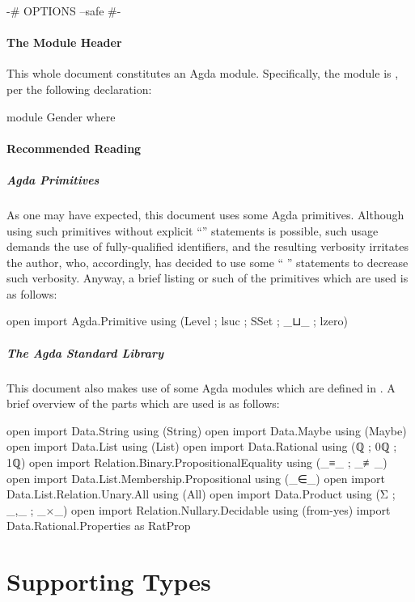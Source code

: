 \documentclass{article}
\theoremstyle{remark}
\begin{document}
\begin{code}
{-# OPTIONS --safe #-}
\end{code}

\paragraph{The Module Header}
This whole document constitutes an Agda module.  Specifically, the module is , per the following declaration:

\begin{code}
module Gender where
\end{code}

\paragraph{Recommended Reading}

\subparagraph{Agda Primitives}
As one may have expected, this document uses some Agda primitives.  Although using such primitives without explicit ``'' statements is possible, such usage demands the use of fully-qualified identifiers, and the resulting verbosity irritates the author, who, accordingly, has decided to use some `` '' statements to decrease such verbosity.  Anyway, a brief listing or such of the primitives which are used is as follows:

\begin{code}
open import Agda.Primitive using (Level ; lsuc ; SSet ; _⊔_ ; lzero)
\end{code}

\subparagraph{The Agda Standard Library}
This document also makes use of some Agda modules which are defined in \textcite{agdaStdlib}.  A brief overview of the parts which are used is as follows:

\begin{code}
open import Data.String using (String)
open import Data.Maybe using (Maybe)
open import Data.List using (List)
open import Data.Rational using (ℚ ; 0ℚ ; 1ℚ)
open import Relation.Binary.PropositionalEquality using (_≡_ ; _≢_)
open import Data.List.Membership.Propositional using (_∈_)
open import Data.List.Relation.Unary.All using (All)
open import Data.Product using (Σ ; _,_ ; _×_)
open import Relation.Nullary.Decidable using (from-yes)
import Data.Rational.Properties as RatProp
\end{code}

\section{Supporting Types}
\end{document}
